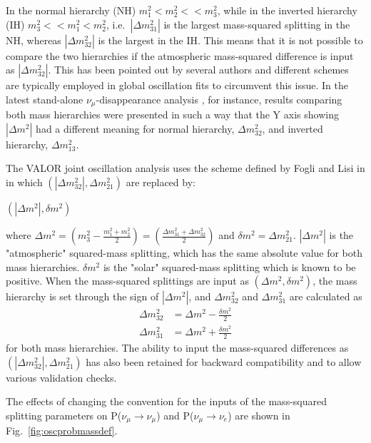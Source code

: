 In the normal hierarchy (NH) $m_{1}^{2}<m_{2}^{2}<<m_{3}^{2}$, while in the inverted hierarchy (IH) $m_{3}^{2}<<m_{1}^{2}<m_{2}^{2}$,
i.e.\ $|\Delta m_{31}^{2}|$ is the largest mass-squared splitting in the NH, whereas $|\Delta m_{32}^{2}|$ is the largest in the IH. 
This means that it is not possible to compare the two hierarchies if the atmospheric mass-squared difference is input as 
$|\Delta m_{32}^{2}|$. This has been pointed out by several authors and different schemes are typically employed in global
oscillation fits to circumvent this issue. In the latest stand-alone $\nu_{\mu}$-disappearance analysis \cite{OurRun1234DisappAnalysis3Flavour}, for instance, results comparing both mass hierarchies were presented in such a way that the Y axis showing $|\Delta m^{2}|$ had a different meaning for normal hierarchy, $\Delta m^{2}_{32}$, and inverted hierarchy, $\Delta m^{2}_{13}$.

The VALOR joint oscillation analysis uses the scheme defined by Fogli and Lisi in 
\cite{LisiGlobalAnalysis} \cite{Fogli} in which $\left( |\Delta m_{32}^{2}|, \Delta m_{21}^{2} \right)$ are replaced by:
\begin{center}
$\left( |\Delta m^{2}|, \delta m^{2} \right)$
\end{center}
where 
$\Delta m^{2} = \left(m_{3}^{2} - \frac {m_{1}^{2}+m_{2}^{2}} {2} \right) =  \left( \frac {\Delta m_{31}^{2} + \Delta m_{32}^{2}} {2} \right)$
and 
$\delta m^{2} = \Delta m_{21}^{2}$.
$|\Delta m^{2}|$ is the "atmospheric" squared-mass splitting, which has the same absolute value for both mass hierarchies.
$\delta m^{2}$ is the "solar" squared-mass splitting which is known to be positive. When the mass-squared splittings are input as 
$\left(\Delta m^{2}, \delta m^{2} \right)$, the mass hierarchy is set through the sign of $|\Delta m^{2}|$, and $\Delta m_{32}^{2}$ 
and $\Delta m_{31}^{2}$ are calculated as 
\begin{displaymath}
\begin{split}
\Delta m_{32}^{2} &= \Delta m^{2} - \frac{\delta m^{2}}{2}  \\
\Delta m_{31}^{2} &= \Delta m^{2} + \frac{\delta m^{2}}{2}
\end{split}
\end{displaymath}
for both mass hierarchies. The ability to input the mass-squared differences as $\left( |\Delta m_{32}^{2}|, \Delta m_{21}^{2} \right)$ has also been retained for 
backward compatibility and to allow various validation checks.

The effects of changing the convention for the inputs of the mass-squared splitting parameters on P($\nu_{\mu}\rightarrow\nu_{\mu}$) 
and P($\nu_{\mu}\rightarrow\nu_{e}$) are shown in Fig.\ \ref{fig:oscprobmassdef}. 

